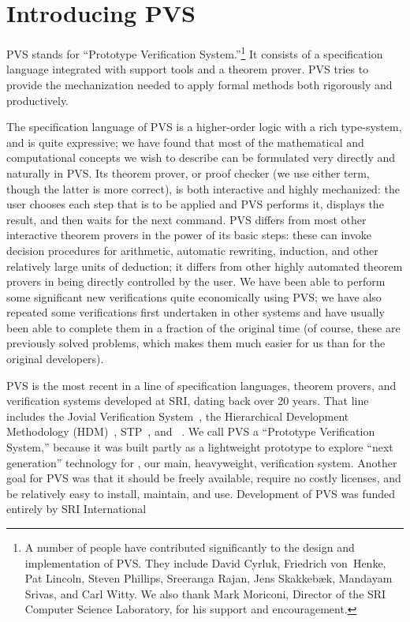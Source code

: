 
\section{Introducing PVS}

PVS stands for ``Prototype Verification System.''\footnote{A number of
people have contributed significantly to the design and implementation
of PVS.  They include David Cyrluk, Friedrich von~Henke, Pat Lincoln,
Steven Phillips, Sreeranga Rajan, Jens Skakkeb\ae{}k, Mandayam Srivas,
and Carl Witty.  We also thank Mark Moriconi, Director of the SRI
Computer Science Laboratory, for his support and encouragement.} It
consists of a specification language integrated with support tools and
a theorem prover.  PVS tries to provide the mechanization needed to
apply formal methods both rigorously and productively.



The specification language of PVS is a higher-order logic with a rich
type-system, and is quite expressive; we have found that most of the
mathematical and computational concepts we wish to describe can be
formulated very directly and naturally in PVS\@.  Its theorem prover, or
proof checker (we use either term, though the latter is more correct),
is both interactive and highly mechanized: the user chooses each step
that is to be applied and PVS performs it, displays the result, and then
waits for the next command.  PVS differs from most other interactive
theorem provers in the power of its basic steps: these can invoke
decision procedures for arithmetic, automatic rewriting, induction, and
other relatively large units of deduction; it differs from other highly
automated theorem provers in being directly controlled by the user.  We
have been able to perform some significant new verifications quite
economically using PVS; we have also repeated some verifications first
undertaken in other systems and have usually been able to complete them
in a fraction of the original time (of course, these are previously
solved problems, which makes them much easier for us than for the
original developers).

PVS is the most recent in a line of specification languages, theorem
provers, and verification systems developed at SRI, dating back over
20 years.  That line includes the Jovial Verification
System~\cite{jovial:pv}, the Hierarchical Development Methodology
(HDM)~\cite{Robinson&Levitt,HDM:Handbook}, STP~\cite{STP}, and
\ehdm~\cite{Melliar-Smith&Rushby,EHDM:tutorial}.  We call PVS a
``Prototype Verification System,'' because it was built partly as a
lightweight prototype to explore ``next generation'' technology for
\ehdm, our main, heavyweight, verification system.  Another goal for
PVS was that it should be freely available, require no costly
licenses, and be relatively easy to install, maintain, and use.
Development of PVS was funded entirely by SRI International

